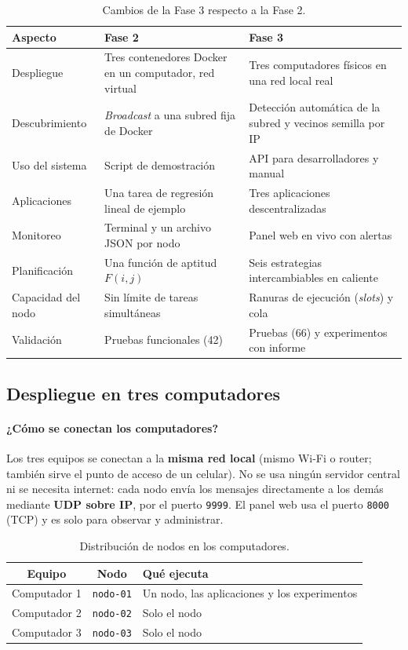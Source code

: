 \begin{table}[htbp]
\centering
\small
\begin{tabular}{|p{}|p{}|p{}|}
\hline
\textbf{Aspecto} & \textbf{Fase 2} & \textbf{Fase 3} \\ \hline
Despliegue & Tres contenedores Docker en un computador, red virtual & Tres computadores físicos en una red local real \\ \hline
Descubrimiento & \emph{Broadcast} a una subred fija de Docker & Detección automática de la subred y vecinos semilla por IP \\ \hline
Uso del sistema & Script de demostración & API para desarrolladores y manual \\ \hline
Aplicaciones & Una tarea de regresión lineal de ejemplo & Tres aplicaciones descentralizadas \\ \hline
Monitoreo & Terminal y un archivo JSON por nodo & Panel web en vivo con alertas \\ \hline
Planificación & Una función de aptitud $F(i,j)$ & Seis estrategias intercambiables en caliente \\ \hline
Capacidad del nodo & Sin límite de tareas simultáneas & Ranuras de ejecución (\emph{slots}) y cola \\ \hline
Validación & Pruebas funcionales (42) & Pruebas (66) y experimentos con informe \\ \hline
\end{tabular}
\caption{Cambios de la Fase 3 respecto a la Fase 2.}
\label{tab:fase2-fase3}
\end{table}

\subsection{Despliegue en tres computadores}

\paragraph{¿Cómo se conectan los computadores?}
Los tres equipos se conectan a la \textbf{misma red local} (mismo Wi-Fi o router; también sirve el
punto de acceso de un celular). No se usa ningún servidor central ni se necesita internet: cada
nodo envía los mensajes directamente a los demás mediante \textbf{UDP sobre IP}, por el puerto
\texttt{9999}. El panel web usa el puerto \texttt{8000} (TCP) y es solo para observar y administrar.

\begin{table}[htbp]
\centering
\small
\begin{tabular}{|c|c|p{}|}
\hline
\textbf{Equipo} & \textbf{Nodo} & \textbf{Qué ejecuta} \\ \hline
Computador 1 & \texttt{nodo-01} & Un nodo, las aplicaciones y los experimentos \\ \hline
Computador 2 & \texttt{nodo-02} & Solo el nodo \\ \hline
Computador 3 & \texttt{nodo-03} & Solo el nodo \\ \hline
\end{tabular}
\caption{Distribución de nodos en los computadores.}
\label{tab:tres-pcs}
\end{table}

